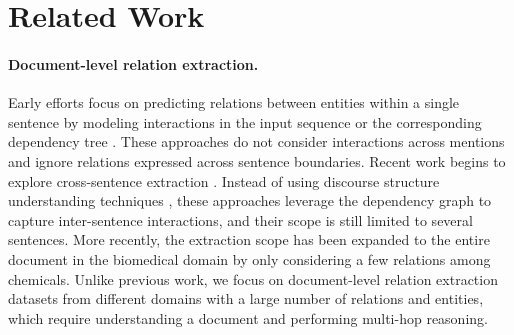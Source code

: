 \documentclass[11pt,a4paper]{article}
\begin{document}
 \section{Related Work}
\label{sec:5}



\paragraph{Document-level relation extraction.} 
Early efforts focus on predicting relations between entities within a single sentence by modeling interactions in the input sequence \citep{Zeng2014RelationCV, Wang2016RelationCV, Zhou2016AttentionBasedBL, Zhang2017PositionawareAA, Guo2020Forests} or the corresponding dependency tree \citep{Xu2015SemanticRC, Xu2015ClassifyingRV, Liu2015ADN, Miwa2016EndtoEndRE, Zhang2018GraphCO}. These approaches do not consider interactions across mentions and ignore relations expressed across sentence boundaries. Recent work begins to explore cross-sentence extraction \citep{Quirk2017DistantSF, Peng2017CrossSentenceNR, Gupta2018NeuralRE, Song2018NaryRE, song-etal-2019-leveraging}. Instead of using discourse structure understanding techniques \citep{LiuDRS, Lei2017Swim, Lei2018Linguistic}, these approaches leverage the dependency graph to capture inter-sentence interactions, and their scope is still limited to several sentences. More recently, the extraction scope has been expanded to the entire document \citep{Verga2018SimultaneouslyST, Jia2019DocumentLevelNR, Sahu2019IntersentenceRE, christopoulou2019connecting} in the biomedical domain by only considering a few relations among chemicals. Unlike previous work, we focus on document-level relation extraction datasets \citep{yao2019DocRED, Li2016BioCreativeVC, wu2019renet} from different domains with a large number of relations and entities, which require understanding a document and performing multi-hop reasoning. 
\end{document}
